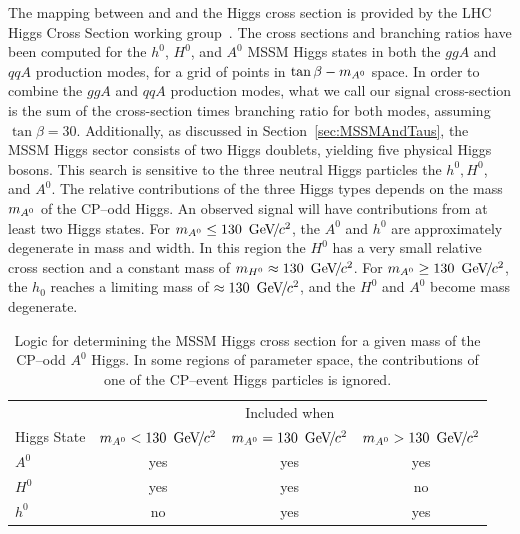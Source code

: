 The mapping between \ma and \tb and the Higgs cross section is provided by the
LHC Higgs Cross Section working group~\cite{LHC-HCWG}.  The cross sections and
branching ratios have been computed for the $h^0$, $H^0$, and $A^0$ MSSM Higgs
states in both the $ggA$ and $qqA$ production modes, for a grid of points in
$\mbox{\ensuremath{\tan\beta}}-m_{A^0}$ space.  In order to combine the $ggA$ and $qqA$ production modes, what
we call our signal cross-section is the sum of the cross-section times branching
ratio for both modes, assuming \mbox{$\tan\beta = 30$}.  Additionally, as
discussed in Section~\ref{sec:MSSMAndTaus}, the MSSM Higgs sector consists of
two Higgs doublets, yielding five physical Higgs bosons.  This search is
sensitive to the three neutral Higgs particles the $h^0, H^0$, and $A^0$.  The
relative contributions of the three Higgs types depends on the mass $\ma$ of the
CP--odd Higgs.  An observed signal will have contributions from at least two
Higgs states.   For $m_{A^0} \leq 130~{\,\text{Ge\hspace{-.08em}V\hspace{-0.16em}/\hspace{-0.08em}}c^\text{2}}$, the $A^0$ and $h^0$ are approximately
degenerate in mass and width.  In this region the $H^0$ has a very small
relative cross section and a constant mass of $m_{H^0} \approx 130~{\,\text{Ge\hspace{-.08em}V\hspace{-0.16em}/\hspace{-0.08em}}c^\text{2}}$.  For
$m_{A^0} \geq 130~{\,\text{Ge\hspace{-.08em}V\hspace{-0.16em}/\hspace{-0.08em}}c^\text{2}}$, the $h_0$ reaches a limiting mass of $\approx
130~{\,\text{Ge\hspace{-.08em}V\hspace{-0.16em}/\hspace{-0.08em}}c^\text{2}}$, and the $H^0$ and $A^0$ become mass degenerate.   
%
\begin{table}
  \centering
  \begin{tabular}{l|ccc} 
                & \multicolumn{3}{c}{Included when} \\
    Higgs State & $m_{A^0} < 130~{\,\text{Ge\hspace{-.08em}V\hspace{-0.16em}/\hspace{-0.08em}}c^\text{2}}$ & $m_{A^0} = 130~{\,\text{Ge\hspace{-.08em}V\hspace{-0.16em}/\hspace{-0.08em}}c^\text{2}}$ & $m_{A^0} > 130~{\,\text{Ge\hspace{-.08em}V\hspace{-0.16em}/\hspace{-0.08em}}c^\text{2}}$ \\
    \hline
    $A^0$       & yes & yes & yes \\
    $H^0$       & yes & yes & no \\
    $h^0$       & no & yes & yes \\
  \end{tabular}
  \caption[Contributions of different MSSM Higgs boson types at different
  $\ma$.]{Logic for determining the MSSM Higgs cross section for a given mass of
  the CP--odd $A^0$ Higgs.  In some regions of parameter space, the
  contributions of one of the
  CP--event Higgs particles is ignored.}
  \label{tab:HiggsXSectionCombination}
\end{table}

